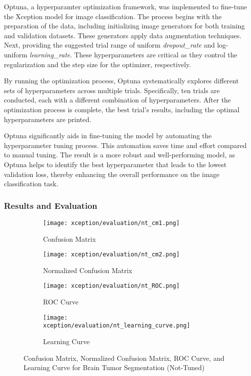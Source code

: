 Optuna, a hyperparamter optimization framework, was implemented to fine-tune the Xception model for image classification. The process begins with the preparation of the data, including initializing image generators for both training and validation datasets. These generators apply data augmentation techniques. Next, providing the suggested trial range of uniform \textit{dropout_rate} and log-uniform \textit{learning_rate}. These hyperparameters are critical as they control the regularization and the step size for the optimizer, respectively. 

By running the optimization process, Optuna systematically explores different sets of hyperparameters across multiple trials. Specifically, ten trials are conducted, each with a different combination of hyperparameters. After the optimization process is complete, the best trial's results, including the optimal hyperparameters are printed. 

Optuna significantly aids in fine-tuning the model by automating the hyperparameter tuning process. This automation saves time and effort compared to manual tuning. The result is a more robust and well-performing model, as Optuna helps to identify the best hyperparameter that leads to the lowest validation loss, thereby enhancing the overall performance on the image classification task.


\subsubsection{Results and Evaluation}


\begin{figure}[H]
    \centering
    \begin{subfigure}[b]{0.2\textwidth}
      \centering
      \texttt{[image: xception/evaluation/nt\_cm1.png]}
      \caption{Confusion Matrix}
      \label{fig:xception_nt_cm1}
    \end{subfigure}
    \hfill
    \begin{subfigure}[b]{0.2\textwidth}
      \centering
      \texttt{[image: xception/evaluation/nt\_cm2.png]}
      \caption{Normalized Confusion Matrix}
      \label{fig:xception_nt_cm2}
    \end{subfigure}
    \hfill
    \begin{subfigure}[b]{0.25\textwidth}
      \centering
      \texttt{[image: xception/evaluation/nt\_ROC.png]}
      \caption{ROC Curve}
      \label{fig:xception_nt_roc}
    \end{subfigure}
    \hfill
    \begin{subfigure}[b]{0.25\textwidth}
      \centering
      \texttt{[image: xception/evaluation/nt\_learning\_curve.png]}
      \caption{Learning Curve}
      \label{fig:xception_nt_learning_curve}
    \end{subfigure}
    \caption{Confusion Matrix, Normalized Confusion Matrix, ROC Curve, and Learning Curve for Brain Tumor Segmentation (Not-Tuned)}
    \label{fig:xception_nt_evaluation}
  \end{figure}
  
